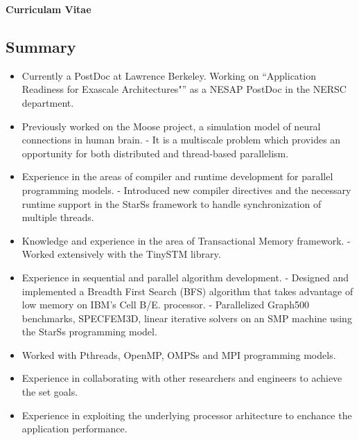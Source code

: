\documentclass[margin]{res}
\begin{document}
%
\textbf{Curriculam Vitae }

\begin{resume}
%
  \section{Summary}
  \begin{itemize}
%
    \item Currently a PostDoc at Lawrence Berkeley. Working on \enquote{Application Readiness for Exascale Architectures"} as a NESAP PostDoc in the NERSC department.
%
	   \item Previously worked on the Moose project, a simulation model of neural connections in human brain.
			 \subitem - It is a multiscale problem which provides an opportunity for both distributed and thread-based parallelism.
%
	   \item Experience in the areas of compiler and runtime development for parallel programming models.
			 \subitem - Introduced new compiler directives and the necessary runtime support in the StarSs framework to handle synchronization of multiple threads.
%
	   \item Knowledge and experience in the area of Transactional Memory framework.
			 \subitem - Worked extensively with the TinySTM library.
%
	   \item  Experience in sequential and parallel algorithm development.
			 \subitem  - Designed and implemented a Breadth First Search (BFS) algorithm that takes advantage of low memory on IBM's Cell B/E. processor.
			 \subitem  - Parallelized Graph500 benchmarks, SPECFEM3D, linear iterative solvers on an SMP machine using the StarSs programming model.
%
	   \item Worked with Pthreads, OpenMP, OMPSs and MPI programming models.
	   \item Experience in collaborating with other researchers and engineers to achieve the set goals.
	   \item Experience in exploiting the underlying processor arhitecture to enchance the application performance.


\end{itemize}
\end{resume}
\end{document}
